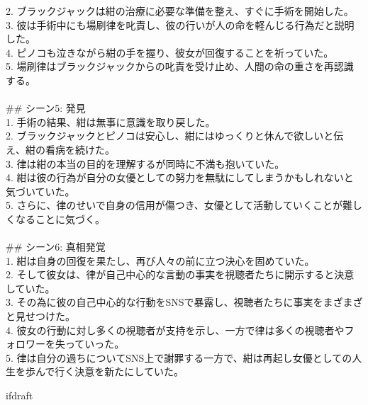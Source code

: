 \documentclass[a4j,12pt]{jsreport}
\begin{document}
\begin{breakitembox}
   2. ブラックジャックは紺の治療に必要な準備を整え、すぐに手術を開始した。\\
   3. 彼は手術中にも場刷律を叱責し、彼の行いが人の命を軽んじる行為だと説明した。\\
   4. ピノコも泣きながら紺の手を握り、彼女が回復することを祈っていた。\\
   5. 場刷律はブラックジャックからの叱責を受け止め、人間の命の重さを再認識する。\\
   \\
   \#\# シーン5: 発見\\
   1. 手術の結果、紺は無事に意識を取り戻した。\\
   2. ブラックジャックとピノコは安心し、紺にはゆっくりと休んで欲しいと伝え、紺の看病を続けた。\\
   3. 律は紺の本当の目的を理解するが同時に不満も抱いていた。\\
   4. 紺は彼の行為が自分の女優としての努力を無駄にしてしまうかもしれないと気づいていた。\\
   5. さらに、律のせいで自身の信用が傷つき、女優として活動していくことが難しくなることに気づく。\\
   \\
   \#\# シーン6: 真相発覚\\
   1. 紺は自身の回復を果たし、再び人々の前に立つ決心を固めていた。\\
   2. そして彼女は、律が自己中心的な言動の事実を視聴者たちに開示すると決意していた。\\
   3. その為に彼の自己中心的な行動をSNSで暴露し、視聴者たちに事実をまざまざと見せつけた。\\
   4. 彼女の行動に対し多くの視聴者が支持を示し、一方で律は多くの視聴者やフォロワーを失っていった。\\
   5. 律は自分の過ちについてSNS上で謝罪する一方で、紺は再起し女優としての人生を歩んで行く決意を新たにしていた。
\end{breakitembox}


\expandafter\ifx\csname ifdraft\endcsname\relax
   \fancyhead[LO]{}
   \printbibliography[title=参考文献]
   
\end{document}
